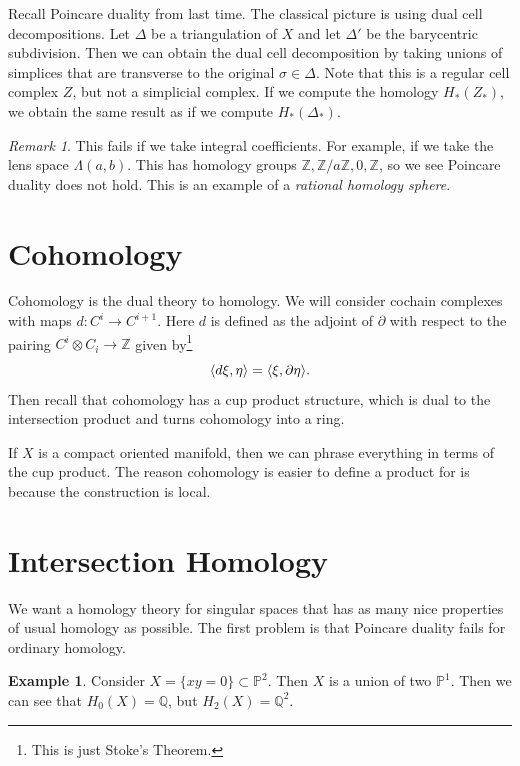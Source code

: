\documentclass[leqno, openany]{memoir}
\DeclarePairedDelimiter{\gen}{\langle}{\rangle}
\theoremstyle{definition}
\newtheorem{exm}[thm]{Example}
\theoremstyle{remark}
\newtheorem{rmk}[thm]{Remark}
\theoremstyle{plain}
\theoremstyle{definition}
\theoremstyle{remark}
\newcommand{\Z}{\mathbb{Z}}
\newcommand{\Q}{\mathbb{Q}}
\renewcommand{\P}{\mathbb{P}}
\begin{document}
Recall Poincare duality from last time. The classical picture is using dual cell decompositions. Let $\Delta$ be a triangulation of $X$ and let $\Delta'$ be the barycentric subdivision. Then we can obtain the dual cell decomposition by taking unions of simplices that are transverse to the original $\sigma \in \Delta$. Note that this is a regular cell complex $Z$, but not a simplicial complex. If we compute the homology $H_*(Z_*)$, we obtain the same result as if we compute $H_*(\Delta_*)$.

\begin{rmk}
    This fails if we take integral coefficients. For example, if we take the lens space $\Lambda(a,b)$. This has homology groups $\Z, \Z/a\Z, 0, \Z$, so we see Poincare duality does not hold. This is an example of a \textit{rational homology sphere}.
\end{rmk}

\section{Cohomology}%
\label{sec:cohomology}

Cohomology is the dual theory to homology. We will consider cochain complexes with maps $d: C^i \to C^{i+1}$. Here $d$ is defined as the adjoint of $\partial$ with respect to the pairing $C^i \otimes C_i \to \Z$ given by\footnote{This is just Stoke's Theorem.}
\[ \gen{ d \xi, \eta } = \gen{\xi, \partial \eta}. \]
Then recall that cohomology has a cup product structure, which is dual to the intersection product and turns cohomology into a ring.

If $X$ is a compact oriented manifold, then we can phrase everything in terms of the cup product. The reason cohomology is easier to define a product for is because the construction is local.

\section{Intersection Homology}%
\label{sec:intersection_homology}

We want a homology theory for singular spaces that has as many nice properties of usual homology as possible. The first problem is that Poincare duality fails for ordinary homology.

\begin{exm}
    Consider $X = \{ xy = 0 \} \subset \P^2$. Then $X$ is a union of two $\P^1$. Then we can see that $H_0(X) = \Q$, but $H_2(X) = \Q^2$.
\end{exm}
\end{document}
